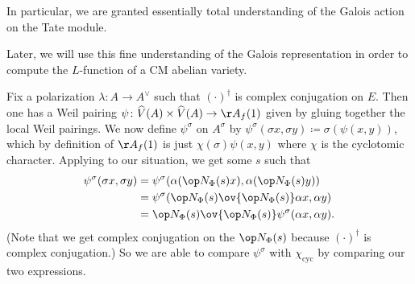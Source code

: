 \documentclass[../notes.tex]{subfiles}
\begin{document}
In particular, we are granted essentially total understanding of the Galois action on the Tate module.
\begin{remark}
	Later, we will use this fine understanding of the Galois representation in order to compute the $L$-function of a CM abelian variety.
\end{remark}
\begin{remark} \label{rem:polarization-main-theorem}
	Fix a polarization $\lambda\colon A\to A^\lor$ such that $(\cdot)^\dagger$ is complex conjugation on $E$. Then one has a Weil pairing $\psi\colon\widehat V(A)\times\widehat V(A)\to\AA_f(1)$ given by gluing together the local Weil pairings. We now define $\psi^\sigma$ on $A^\sigma$ by $\psi^\sigma(\sigma x,\sigma y)\coloneqq\sigma(\psi(x,y))$, which by definition of $\AA_f(1)$ is just $\chi(\sigma)\psi(x,y)$ where $\chi$ is the cyclotomic character. Applying  to our situation, we get some $s$ such that
	\begin{align*}
		\psi^\sigma(\sigma x,\sigma y) &= \psi^\sigma(\alpha(\op N_\Phi(s)x),\alpha(\op N_\Phi(s)y)) \\
		&= \psi^\sigma(\op N_\Phi(s)\ov{\op N_\Phi(s)}\alpha x,\alpha y) \\
		&= \op N_\Phi(s)\ov{\op N_\Phi(s)}\psi^\sigma(\alpha x,\alpha y).
	\end{align*}
	(Note that we get complex conjugation on the $\op N_\Phi(s)$ because $(\cdot)^\dagger$ is complex conjugation.) So we are able to compare $\psi^\sigma$ with $\chi_{\mathrm{cyc}}$ by comparing our two expressions.
\end{remark}
\end{document}

